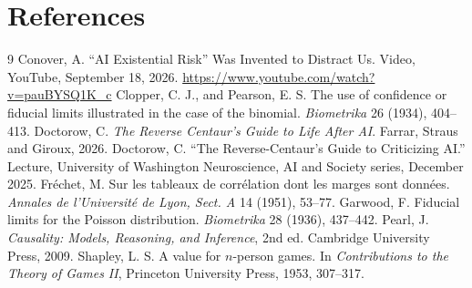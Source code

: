 \documentclass[11pt]{article}
\theoremstyle{definition}
\begin{document}
\section*{References}
\begin{thebibliography}{9}
 Conover, A. ``AI Existential Risk'' Was Invented to Distract Us. Video, YouTube, September 18, 2026. \url{https://www.youtube.com/watch?v=pauBYSQ1K_c}
 Clopper, C. J., and Pearson, E. S. The use of confidence or fiducial limits illustrated in the case of the binomial. \emph{Biometrika} 26 (1934), 404--413.
 Doctorow, C. \emph{The Reverse Centaur's Guide to Life After AI}. Farrar, Straus and Giroux, 2026.
 Doctorow, C. ``The Reverse-Centaur's Guide to Criticizing AI.'' Lecture, University of Washington Neuroscience, AI and Society series, December 2025.
 Fr\'echet, M. Sur les tableaux de corr\'elation dont les marges sont donn\'ees. \emph{Annales de l'Universit\'e de Lyon, Sect. A} 14 (1951), 53--77.
 Garwood, F. Fiducial limits for the Poisson distribution. \emph{Biometrika} 28 (1936), 437--442.
 Pearl, J. \emph{Causality: Models, Reasoning, and Inference}, 2nd ed. Cambridge University Press, 2009.
 Shapley, L. S. A value for $n$-person games. In \emph{Contributions to the Theory of Games II}, Princeton University Press, 1953, 307--317.
\end{thebibliography}
\end{document}

